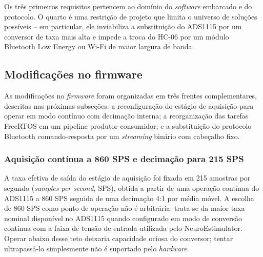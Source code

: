Os três primeiros requisitos pertencem ao domínio do \textit{software} embarcado e do protocolo. O quarto é uma restrição de projeto que limita o universo de soluções possíveis -- em particular, ele inviabiliza a substituição do ADS1115 por um conversor de taxa mais alta e impede a troca do HC-06 por um módulo Bluetooth Low Energy ou Wi-Fi de maior largura de banda.

\subsection{Modificações no firmware}\label{subsec:NEFirmware}

As modificações no \textit{firmware} foram organizadas em três frentes complementares, descritas nas próximas subseções: a reconfiguração do estágio de aquisição para operar em modo contínuo com decimação interna; a reorganização das tarefas FreeRTOS em um pipeline produtor-consumidor; e a substituição do protocolo Bluetooth comando-resposta por um \textit{streaming} binário com cabeçalho fixo.

\subsubsection{Aquisição contínua a 860 SPS e decimação para 215 SPS}\label{subsubsec:NEDecimacao}

A taxa efetiva de saída do estágio de aquisição foi fixada em 215 amostras por segundo (\textit{samples per second}, SPS), obtida a partir de uma operação contínua do ADS1115 a 860 SPS seguida de uma decimação 4:1 por média móvel. A escolha de 860 SPS como ponto de operação não é arbitrária: trata-se da maior taxa nominal disponível no ADS1115 quando configurado em modo de conversão contínua com a faixa de tensão de entrada utilizada pelo NeuroEstimulator. Operar abaixo desse teto deixaria capacidade ociosa do conversor; tentar ultrapassá-lo simplesmente não é suportado pelo \textit{hardware}.

